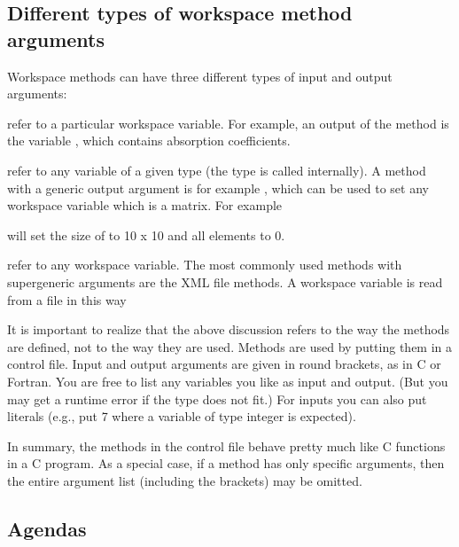 \subsection{Different types of workspace method arguments}

Workspace methods can have three different types of input and output
arguments: 

\emph{} refer to a particular workspace
variable. For example, an output of the method
 is the variable , which
contains absorption coefficients.

\emph{} refer to any variable of a given
type (the type is called 
internally).  A method with a generic output argument is for example
, which can be used to set any workspace
variable which is a matrix. For example
\begin{quote}
\end{quote}
will set the size of  to 10 x 10 and all
elements to 0.

\emph{} refer to any workspace
variable.  The most commonly used methods with supergeneric arguments
are the XML file methods. A workspace variable is read from a file in
this way
\begin{quote}
\end{quote}

It is important to realize that the above discussion refers to the way
the methods are defined, not to the way they are used. Methods are
used by putting them in a control file. Input and output arguments are
given in round brackets, as in C or Fortran. You are free to list any
variables you like as input and output. (But you may get a runtime
error if the type does not fit.) For inputs you can also put literals
(e.g., put 7 where a variable of type integer is expected). 

In summary, the methods in the control file behave pretty much like C
functions in a C program. As a special case, if a method has only
specific arguments, then the entire argument list (including the
brackets) may be omitted.


\subsection{Agendas}

